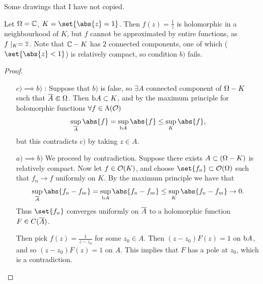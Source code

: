 \begin{example}
    Some drawings that I have not copied.
\end{example}

\begin{example}
    Let $\Omega = \mathbb{C}$, $K = \set{\abs{z} = 1}$. Then $f(z) = \frac{1}{z}$ is holomorphic in a neighbourhood of $K$, but $f$ cannot be approximated by entire functions, as $f\mid_K = \overline{z} $. Note that $\mathbb{C} - K $ has $2$ connected components, one of which ($\set{\abs{z} < 1}$) is relatively compact, so condition $b)$ fails.
\end{example}

\begin{proof} \phantom{.}
    \begin{itemize}
        \item[$\boxed{c) \implies b)}$]: Suppose that $b)$ is false, so $\exists A$ connected component of $\Omega - K$ such that $\overline{A} \Subset \Omega$. Then $\operatorname{b}\! A \subset K$, and by the maximum principle for holomorphic functions $\forall f \in \Lambda(\mathcal{O})$
        \begin{align*}
            \sup_{\ov{A}} \abs{f} = \sup_{\bdy A} \abs{f} \leq \sup_{K} \abs{f},
        \end{align*}
        but this contradicts $c)$ by taking $z \in A$.
        \item[$\boxed{a) \implies b)}$] We proceed by contradiction. Suppose there exists $A \subset (\Omega - K)$ is relatively compact. Now let $f \in \mathcal{O}(K)$, and choose $\set{ f_n } \subset \O(\om)$ such that $f_n \to f$ uniformly on $K$. By the maximum principle we have that
        \begin{align*}
            \sup_{\ov{A}} \abs{f_n - f_m} = \sup_{\bdy A} \abs{f_n - f_m} \leq \sup_{K} \abs{f_n - f_m} \to 0.
        \end{align*}
        Thus $\set{f_n}$ converges uniformly on $\overline{A}$ to a holomorphic function $F \in C(\overline{A})$.

        Then pick $f(z) = \frac{1}{z-z_0}$ for some $z_0 \in A$. Then $(z-z_0) F(z) = 1$ on $\operatorname{b}\! A$, and so $(z-z_0) F(z) = 1$ on $A$. This implies that $F$ has a pole at $z_0$, which is a contradiction.


\end{itemize}
\end{proof}
